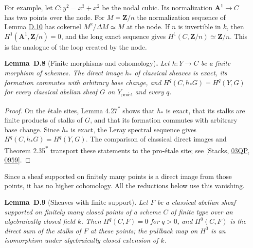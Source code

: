 \documentclass[11pt]{article}
\newenvironment{bpstatement}[2]{\par\addvspace{0.6\baselineskip}\noindent\textbf{#1}#2\textbf{.}\enspace\ignorespaces}
  {\par\addvspace{0.4\baselineskip}}
\newenvironment{bpstatementit}[2]{\begin{bpstatement}{#1}{#2}\itshape\ignorespaces}{\end{bpstatement}}
\newcommand{\bpout}[1]{#1\textsuperscript{\hyperlink{bp-outside}{\ensuremath{\ast}}}}
\begin{document}
For example, let \(C:y^2=x^3+x^2\) be the nodal cubic. Its normalization \(\mathbf A^1\to C\) has two points over the node. For \(M=\mathbf Z/n\) the normalization sequence of Lemma \hyperref[bp205]{D.10} has cokernel \(M^2/\Delta M\simeq M\) at the node. If \(n\) is invertible in \(k\), then \(H^1(\mathbf A^1,\mathbf Z/n)=0\), and the long exact sequence gives \(H^1(C,\mathbf Z/n)\simeq\mathbf Z/n\). This is the analogue of the loop created by the node.

\label{bp199}%
\begin{bpstatementit}{Lemma~D.8}{ (Finite morphisms and cohomology)}
Let \(h:Y\to C\) be a finite morphism of schemes. The direct image \(h_*\) of classical sheaves is exact, its formation commutes with arbitrary base change, and \(H^q(C,h_*G)=H^q(Y,G)\) for every classical abelian sheaf \(G\) on \(Y_{\mathrm{pro}\acute{e}t}\) and every \(q\).
\end{bpstatementit}

\begin{proof}[{Proof}]\label{bp200}%
On the étale sites, Lemma \bpout{4.27} shows that \(h_*\) is exact, that its stalks are finite products of stalks of \(G\), and that its formation commutes with arbitrary base change.  Since \(h_*\) is exact, the Leray spectral sequence gives \(H^q(C,h_*G)=H^q(Y,G)\).  The comparison of classical direct images and Theorem \bpout{2.35} transport these statements to the pro-étale site; see [Stacks, \href{https://stacks.math.columbia.edu/tag/03QP}{03QP}, \href{https://stacks.math.columbia.edu/tag/0959}{0959}].
\end{proof}

\label{bp201}%
Since a sheaf supported on finitely many points is a direct image from those points, it has no higher cohomology. All the reductions below use this vanishing.

\label{bp202}%
\begin{bpstatementit}{Lemma~D.9}{ (Sheaves with finite support)}
Let \(F\) be a classical abelian sheaf supported on finitely many closed points of a scheme \(C\) of finite type over an algebraically closed field \(k\). Then \(H^q(C,F)=0\) for \(q>0\), and \(H^0(C,F)\) is the direct sum of the stalks of \(F\) at these points; the pullback map on \(H^0\) is an isomorphism under algebraically closed extension of \(k\).
\end{bpstatementit}
\end{document}
